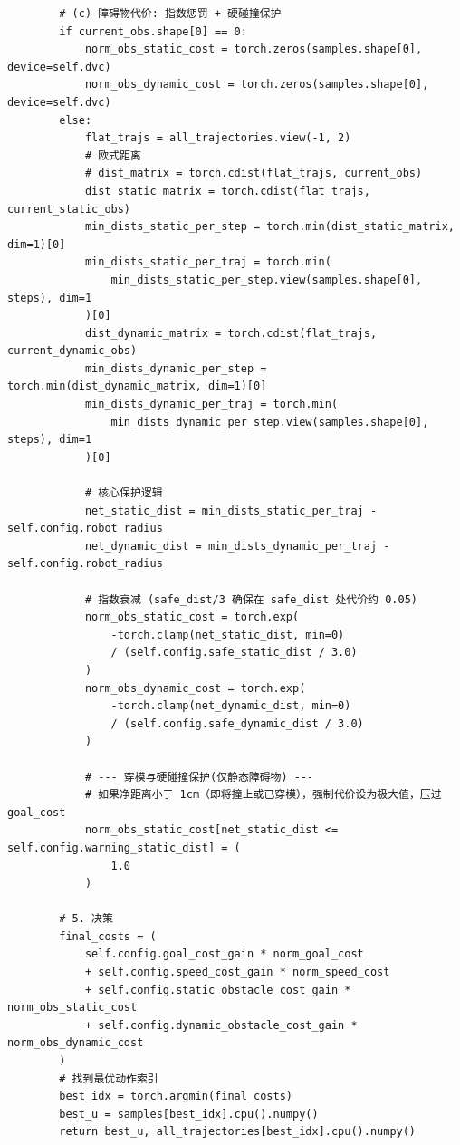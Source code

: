 \begin{verbatim}
        # (c) 障碍物代价: 指数惩罚 + 硬碰撞保护
        if current_obs.shape[0] == 0:
            norm_obs_static_cost = torch.zeros(samples.shape[0], device=self.dvc)
            norm_obs_dynamic_cost = torch.zeros(samples.shape[0], device=self.dvc)
        else:
            flat_trajs = all_trajectories.view(-1, 2)
            # 欧式距离
            # dist_matrix = torch.cdist(flat_trajs, current_obs)
            dist_static_matrix = torch.cdist(flat_trajs, current_static_obs)
            min_dists_static_per_step = torch.min(dist_static_matrix, dim=1)[0]
            min_dists_static_per_traj = torch.min(
                min_dists_static_per_step.view(samples.shape[0], steps), dim=1
            )[0]
            dist_dynamic_matrix = torch.cdist(flat_trajs, current_dynamic_obs)
            min_dists_dynamic_per_step = torch.min(dist_dynamic_matrix, dim=1)[0]
            min_dists_dynamic_per_traj = torch.min(
                min_dists_dynamic_per_step.view(samples.shape[0], steps), dim=1
            )[0]

            # 核心保护逻辑
            net_static_dist = min_dists_static_per_traj - self.config.robot_radius
            net_dynamic_dist = min_dists_dynamic_per_traj - self.config.robot_radius

            # 指数衰减 (safe_dist/3 确保在 safe_dist 处代价约 0.05)
            norm_obs_static_cost = torch.exp(
                -torch.clamp(net_static_dist, min=0)
                / (self.config.safe_static_dist / 3.0)
            )
            norm_obs_dynamic_cost = torch.exp(
                -torch.clamp(net_dynamic_dist, min=0)
                / (self.config.safe_dynamic_dist / 3.0)
            )

            # --- 穿模与硬碰撞保护(仅静态障碍物) ---
            # 如果净距离小于 1cm（即将撞上或已穿模），强制代价设为极大值，压过 goal_cost
            norm_obs_static_cost[net_static_dist <= self.config.warning_static_dist] = (
                1.0
            )

        # 5. 决策
        final_costs = (
            self.config.goal_cost_gain * norm_goal_cost
            + self.config.speed_cost_gain * norm_speed_cost
            + self.config.static_obstacle_cost_gain * norm_obs_static_cost
            + self.config.dynamic_obstacle_cost_gain * norm_obs_dynamic_cost
        )
        # 找到最优动作索引
        best_idx = torch.argmin(final_costs)
        best_u = samples[best_idx].cpu().numpy()
        return best_u, all_trajectories[best_idx].cpu().numpy()
\end{verbatim}

